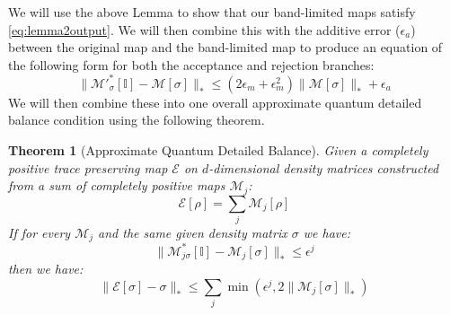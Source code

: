 \documentclass[aps,floatfix,10pt,amssymb,amsfont,amsmath,superscriptaddress,float,nofootinbib,longbibliography,nobalancelastpage,twocolumn]{revtex4-2}
\newtheorem{theorem}{Theorem}
\begin{document}
We will use the above Lemma to show that our band-limited maps satisfy \eqref{eq:lemma2output}. We will then combine this with the additive error ($\epsilon_a$) between the original map and the band-limited map to produce an equation of the following form for both the acceptance and rejection branches:
\begin{equation}
    \|\mathcal{M}'^*_{\sigma}[\mathbb{I}]-\mathcal{M}[\sigma] \|_* \leq (2\epsilon_m+\epsilon_m^2)\|\mathcal{M}[\sigma]\|_* + \epsilon_a
\end{equation}
We will then combine these into one overall approximate quantum detailed balance condition using the following theorem.
\begin{theorem}[Approximate Quantum Detailed Balance]
\label{theorem:quantumapproximatedeatildedbalance}
Given a completely positive trace preserving map $\mathcal{E}$ on $d$-dimensional density matrices constructed from a sum of completely positive maps $\mathcal{M}_j$:
\begin{equation}
    \mathcal{E}[\rho] = \sum_j \mathcal{M}_j[\rho]
\end{equation}
If for every $\mathcal{M}_j$ and the same given density matrix $\sigma$ we have:
\begin{equation}
    \|\mathcal{M}^*_{j\sigma}[\mathbb{I}]-\mathcal{M}_{j}[\sigma]\|_* \leq \epsilon^j
\end{equation}
 then we have:
\begin{equation}
     \|\mathcal{E}[\sigma]-\sigma\|_* \leq \sum_j\min\left(\epsilon^j, 2\|\mathcal{M}_j[\sigma]\|_*\right)
\end{equation}
\end{theorem}
\end{document}

